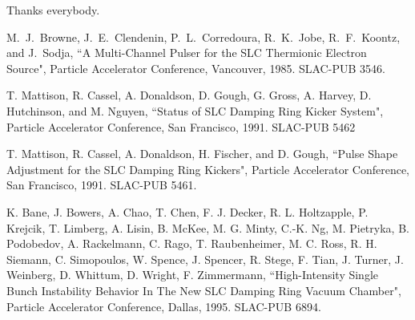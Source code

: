 \documentclass[aps,prl,preprint,groupedaddress]{revtex4-1}
\begin{document}


\begin{acknowledgments}
Thanks everybody.
\end{acknowledgments}

\begin{thebibliography}{9}
% 
  M.~J.~Browne, J.~E.~Clendenin, P.~L.~Corredoura, R.~K.~Jobe, R.~F.~Koontz, and J.~Sodja, 
  ``A Multi-Channel Pulser for the SLC Thermionic Electron Source", 
  Particle Accelerator Conference, Vancouver, 1985. 
  SLAC-PUB 3546.
  
  T. Mattison, R. Cassel, A. Donaldson, D. Gough, G. Gross, A. Harvey, D. Hutchinson, and M. Nguyen,
  ``Status of SLC Damping Ring Kicker System",
  Particle Accelerator Conference, San Francisco, 1991.
  SLAC-PUB 5462
  
  T. Mattison, R. Cassel, A. Donaldson, H. Fischer, and D. Gough,
  ``Pulse Shape Adjustment for the SLC Damping Ring Kickers",
  Particle Accelerator Conference, San Francisco, 1991.
  SLAC-PUB 5461.
  
  K. Bane, J. Bowers, A. Chao, T. Chen, F. J. Decker, R. L. Holtzapple, P. Krejcik, T. Limberg, A. Lisin, B. McKee, M. G. Minty, C.-K. Ng, M. Pietryka, B. Podobedov, A. Rackelmann, C. Rago, T. Raubenheimer, M. C. Ross, R. H. Siemann, C. Simopoulos, W. Spence, J. Spencer, R. Stege, F. Tian, J. Turner, J. Weinberg, D. Whittum, D. Wright, F. Zimmermann,
  ``High-Intensity Single Bunch Instability Behavior In The New SLC Damping Ring Vacuum Chamber",
  Particle Accelerator Conference, Dallas, 1995.
  SLAC-PUB 6894.
    
\end{thebibliography}
\end{document}
